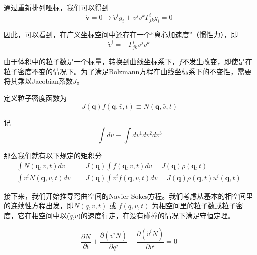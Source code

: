 \documentclass[LBMDerivation.tex]{subfiles}
\begin{document}
通过重新排列哑标，我们可以得到
\begin{equation}
  \dot{\boldsymbol{v}}=0 \rightarrow \dot{v}^{i} g_{i}+v^{j} v^{k} \Gamma_{j k}^{i} g_{i}=0
  \label{EQUATION::A.5} ~
\end{equation}
%
%

因此，可以看到，在广义坐标空间中还存在一个“离心加速度”（惯性力），即
%
%
\begin{equation}
  \dot{v}^{i}=- \Gamma_{j k}^{i}v^{j} v^{k}
  \label{EQUATION::A.6} ~
\end{equation}

由于体积中的粒子数是一个标量，转换到曲线坐标系下，$f$不发生改变，即使是在粒子密度不变的情况下。为了满足Bolzmann方程在曲线坐标系下的不变性，需要将其乘以Jacobian系数$J$。

定义粒子密度函数为
\begin{equation}
  J(\boldsymbol{q}) f(\boldsymbol{q}, \bar{v}, t) \equiv N(\boldsymbol{q}, \bar{v}, t)
\end{equation}

记
\begin{equation}
  \int d \bar{v} \equiv \int d v^{1} d v^{2} d v^{3}
\end{equation}


那么我们就有以下规定的矩积分
%
%
\begin{equation}
  \begin{aligned}
    \int N(\boldsymbol{q}, \bar{v}, t)   d \bar{v}     & =J(\boldsymbol{q}) \int f(\boldsymbol{q}, \bar{v}, t)d \bar{v} =J(\boldsymbol{q}) \rho(\boldsymbol{q}, t)                                \\
    \int v^{i} N(\boldsymbol{q}, \bar{v}, t) d \bar{v} & =J(\boldsymbol{q}) \int v^{i} f(\boldsymbol{q}, \bar{v}, t)d \bar{v} =J(\boldsymbol{q}) \rho(\boldsymbol{q}, t) u^{i}(\boldsymbol{q}, t)
  \end{aligned}
  \label{EQUATION::A.11} ~
\end{equation}


接下来，我们开始推导弯曲空间的Navier-Sokes方程。我们考虑从基本的相空间里的连续性方程出发，即$N(q,v,t)$ 或 $f(q,v,t)$ 为相空间里的粒子数或粒子密度，它在相空间中以($\dot{q}$,$\dot{v}$)的速度行走，在没有碰撞的情况下满足守恒定理。





\begin{equation}
  \frac{\partial N}{\partial t}+\frac{\partial (v^i N)}{\partial q^{j}} +  \frac{\partial (\dot{v}^{i} N)}{\partial  v^{i}} =0
  \label{EQUATION::Bolzmann中间过程2} ~
\end{equation}
\end{document}
